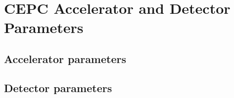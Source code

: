\section{CEPC Accelerator and Detector Parameters}
\label{sec:detector}

\subsection{Accelerator parameters}

\clearpage

\subsection{Detector parameters}

\clearpage

